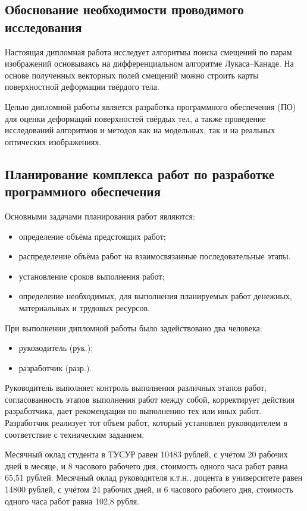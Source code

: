 \subsection{Обоснование необходимости проводимого исследования}
Настоящая дипломная работа исследует алгоритмы поиска смещений по парам изображений основываясь на дифференциальном алгоритме Лукаса--Канаде. На основе полученных векторных полей смещений можно строить карты поверхностной деформации твёрдого тела.

Целью дипломной работы является разработка программного обеспечения (ПО) для оценки деформаций поверхностей твёрдых тел, а также проведение исследований алгоритмов и методов как на модельных, так и на реальных оптических изображениях.

\subsection{Планирование комплекса работ по разработке программного обеспечения}
Основными задачами планирования работ являются:

\begin{itemize}
\item определение объёма предстоящих работ;
\item распределение объёма работ на взаимосвязанные последовательные этапы.
\end{itemize}

\begin{itemize}
\item установление сроков выполнения работ;
\item определение необходимых, для выполнения планируемых работ денежных, материальных и трудовых ресурсов.
\end{itemize}
При выполнении дипломной работы было задействовано два человека:

\begin{itemize}
\item руководитель (рук.);
\item разработчик (разр.).
\end{itemize}

Руководитель выполняет контроль выполнения различных этапов работ, согласованность этапов выполнения работ между собой, корректирует действия разработчика, дает рекомендации по выполнению тех или иных работ. Разработчик реализует тот объем работ, который установлен руководителем в соответствие с техническим заданием.

Месячный оклад студента в ТУСУР равен 10483 рублей, с учётом 20 рабочих дней в месяце, и 8 часового рабочего дня, стоимость одного часа работ равна 65,51 рублей. Месячный оклад руководителя к.т.н., доцента в университете равен 14800 рублей, с учётом 24 рабочих дней, и 6 часового рабочего дня, стоимость одного часа работ равна 102,8 рубля.

